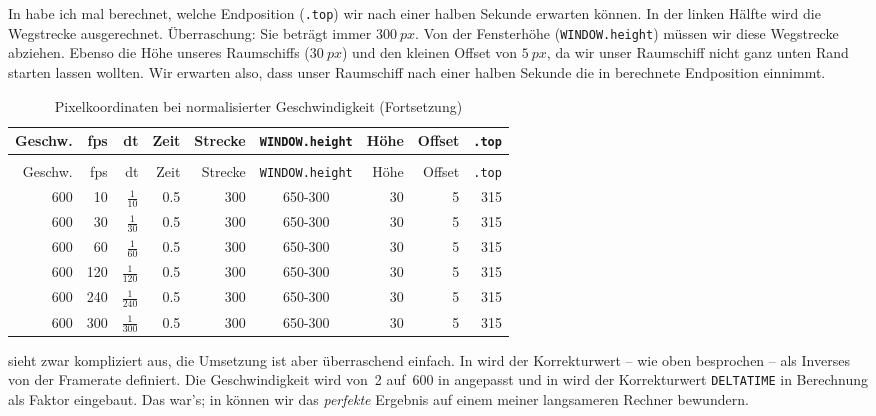 In  habe ich mal berechnet, welche Endposition (\texttt{.top}) wir nach einer halben Sekunde erwarten können. In der linken Hälfte wird die Wegstrecke ausgerechnet. Überraschung: Sie beträgt immer $300~px$. Von der Fensterhöhe (\texttt{WINDOW.height}) müssen wir diese Wegstrecke abziehen. Ebenso die Höhe unseres Raumschiffs ($30~px$) und den kleinen Offset von $5~px$, da wir unser Raumschiff nicht ganz unten Rand starten lassen wollten. Wir erwarten also, dass unser Raumschiff nach einer halben Sekunde die in  berechnete Endposition einnimmt.


\begin{longtable}{r@{ * }r@{ * }r@{ * }r@{ = }r@{ $\rightarrow$ }c@{ - }r@{ - }r@{ = }r}%
	\caption{Pixelkoordinaten bei normalisierter Geschwindigkeit}\label{tabFpsBewegung03} \\[1em]
    Geschw. & fps & dt  & Zeit  & Strecke & \texttt{WINDOW.height} & Höhe & Offset & \texttt{.top}\\[0.5em]\hline\hline
	\hline
	\endfirsthead %
	\caption{Pixelkoordinaten bei normalisierter Geschwindigkeit (Fortsetzung)}\\[1em]
    Geschw. & fps & dt  & Zeit  & Strecke & \texttt{WINDOW.height} & Höhe & Offset & \texttt{.top}\\[0.5em]\hline\hline
	\hline
	\endhead %
	600  &   10 &  $\frac{1}{10}$   & 0.5 & 300 & 650-300 & 30 & 5 & 315 \\ \hline
	600  &   30 &  $\frac{1}{30}$   & 0.5 & 300 & 650-300 & 30 & 5 & 315 \\ \hline
	600  &   60 &  $\frac{1}{60}$   & 0.5 & 300 & 650-300 & 30 & 5 & 315 \\ \hline
	600  &  120 &  $\frac{1}{120}$  & 0.5 & 300 & 650-300 & 30 & 5 & 315 \\ \hline
	600  &  240 &  $\frac{1}{240}$  & 0.5 & 300 & 650-300 & 30 & 5 & 315 \\ \hline
	600  &  300 &  $\frac{1}{300}$  & 0.5 & 300 & 650-300 & 30 & 5 & 315 \\ \hline
\end{longtable} 

 sieht zwar kompliziert aus, die Umsetzung ist aber überraschend einfach. In  wird der Korrekturwert -- wie oben besprochen -- als Inverses von der Framerate definiert. Die Geschwindigkeit wird von~2 auf~600 in  angepasst und in  wird der Korrekturwert \texttt{DELTATIME} in Berechnung als Faktor eingebaut. Das war's; in  können wir das \emph{perfekte} Ergebnis auf einem meiner langsameren Rechner bewundern. 

